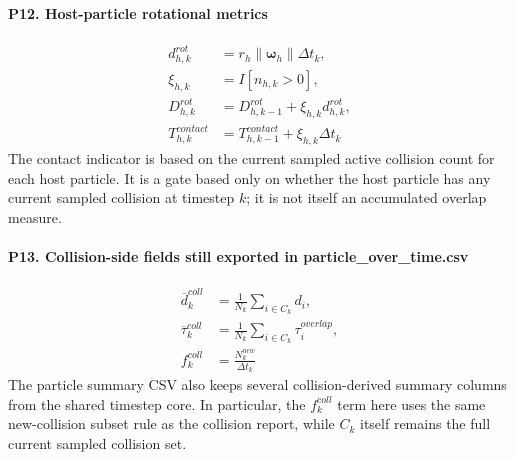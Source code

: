\documentclass[11pt,a4paper]{article}
\begin{document}
\paragraph{P12. Host-particle rotational metrics}
\[
\begin{aligned}
d_{h,k}^{rot} &= r_h \|\boldsymbol{\omega}_h\| \Delta t_k, \\
\xi_{h,k} &= I[n_{h,k} > 0], \\
D_{h,k}^{rot} &= D_{h,k-1}^{rot} + \xi_{h,k} d_{h,k}^{rot}, \\
T_{h,k}^{contact} &= T_{h,k-1}^{contact} + \xi_{h,k}\Delta t_k
\end{aligned}
\]
The contact indicator is based on the current sampled active collision count for each host particle.
It is a gate based only on whether the host particle has any current sampled collision at timestep $k$; it is not itself an accumulated overlap measure.

\paragraph{P13. Collision-side fields still exported in particle\_over\_time.csv}
\[
\begin{aligned}
\overline{d}_k^{coll} &= \frac{1}{N_k}\sum_{i \in C_k} d_i, \\
\overline{\tau}_k^{coll} &= \frac{1}{N_k}\sum_{i \in C_k}\tau_i^{overlap}, \\
f_k^{coll} &= \frac{N_k^{new}}{\Delta t_k}
\end{aligned}
\]
The particle summary CSV also keeps several collision-derived summary columns from the shared timestep core.
In particular, the $f_k^{coll}$ term here uses the same new-collision subset rule as the collision report, while $C_k$ itself remains the full current sampled collision set.
\end{document}
